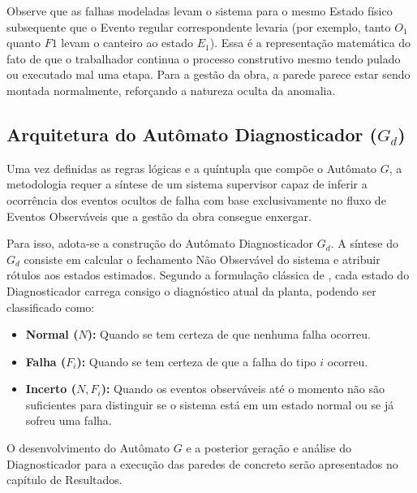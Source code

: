 Observe que as falhas modeladas levam o sistema para o mesmo Estado físico subsequente que o Evento regular correspondente levaria (por exemplo, tanto $O_1$ quanto $F1$ levam o canteiro ao estado $E_1$). Essa é a representação matemática do fato de que o trabalhador continua o processo construtivo mesmo tendo pulado ou executado mal uma etapa. Para a gestão da obra, a parede parece estar sendo montada normalmente, reforçando a natureza oculta da anomalia.

\subsection{Arquitetura do Autômato Diagnosticador ($G_d$)}

Uma vez definidas as regras lógicas e a quíntupla que compõe o Autômato $G$, a metodologia requer a síntese de um sistema supervisor capaz de inferir a ocorrência dos eventos ocultos de falha com base exclusivamente no fluxo de Eventos Observáveis que a gestão da obra consegue enxergar. 

Para isso, adota-se a construção do Autômato Diagnosticador $G_d$. A síntese do $G_d$ consiste em calcular o fechamento Não Observável do sistema e atribuir rótulos aos estados estimados. Segundo a formulação clássica de , cada estado do Diagnosticador carrega consigo o diagnóstico atual da planta, podendo ser classificado como:
\begin{itemize}
	\item \textbf{Normal ($N$):} Quando se tem certeza de que nenhuma falha ocorreu.
	\item \textbf{Falha ($F_i$):} Quando se tem certeza de que a falha do tipo $i$ ocorreu.
	\item \textbf{Incerto ($N, F_i$):} Quando os eventos observáveis até o momento não são suficientes para distinguir se o sistema está em um estado normal ou se já sofreu uma falha.
\end{itemize}

O desenvolvimento do Autômato $G$ e a posterior geração e análise do Diagnosticador para a execução das paredes de concreto serão apresentados no capítulo de Resultados.


